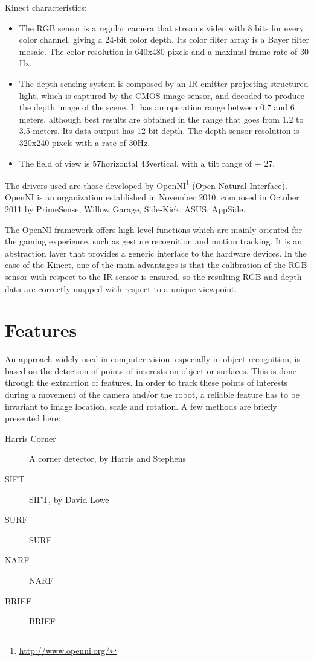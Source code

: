 Kinect characteristics:
\begin{itemize}
 \item The RGB sensor is a regular camera that streams video with 8 bits for every color channel, giving a 24-bit color depth. Its  color filter array is a Bayer filter mosaic. The color resolution is 640x480 pixels and a maximal frame rate of 30 Hz.
 \item The depth sensing system is composed by an IR emitter projecting structured light, which is captured by the CMOS image sensor, and decoded to produce the depth image of the scene. It has an operation range between 0.7 and 6 meters, although best results are obtained in the range that goes from 1.2 to 3.5 meters. Its data output has 12-bit depth. The depth sensor resolution is 320x240 pixels with a rate of 30Hz.
 \item The field of view is 57\textdegree horizontal 43\textdegree vertical, with a tilt range of $\pm$ 27\textdegree.
\end{itemize}

The drivers used are those developed by OpenNI\footnote{\url{http://www.openni.org/}} (Open Natural Interface). OpenNI is an organization established in November 2010, composed in October 2011 by PrimeSense, Willow Garage, Side-Kick, ASUS, AppSide.

The OpenNI framework offers high level functions which are mainly oriented for the gaming experience, such as gesture recognition and motion tracking. It is an abstraction layer that provides a generic interface to the hardware devices. In the case of the Kinect, one of the main advantages is that the calibration of the RGB sensor with respect to the IR sensor is ensured, so the resulting RGB and depth data are correctly mapped with respect to a unique viewpoint.


\section{Features}

An approach widely used in computer vision, especially in object recognition, is based on the detection of points of interests on object or surfaces. This is done through the extraction of features. In order to track these points of interests during a movement of the camera and/or the robot, a reliable feature has to be invariant to image location, scale and rotation. A few methods are briefly presented here:

\begin{description}
\item[Harris Corner] A corner detector, by Harris and Stephens~\cite{Harris88alvey}
\item[\acrshort{SIFT}]\acrlong{SIFT}, by David Lowe~\cite{lowe_2004_sift} 
\item[\acrshort{SURF}]\acrlong{SURF}~\cite{surf}
\item[\acrshort{NARF}]\acrlong{NARF}~\cite{steder10irosws}
\item[\acrshort{BRIEF}]\acrlong{BRIEF}~\cite{Calonder10-brief}
\end{description}

